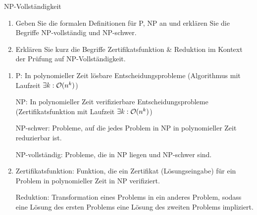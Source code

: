 \documentclass{article}
\begin{document}
\begin{exercise}{NP-Vollständigkeit}
  \begin{enumerate}
    \item Geben Sie die formalen Definitionen für P, NP an und erklären Sie die Begriffe NP-vollständig und NP-schwer.
    \item Erklären Sie kurz die Begriffe Zertifikatsfunktion \& Reduktion im Kontext der Prüfung auf NP-Vollständigkeit.
  \end{enumerate}

  \begin{solution}
    \begin{enumerate}
      \item P: In polynomieller Zeit lösbare Entscheidungsprobleme (Algorithmus mit Laufzeit $\exists k: \mathcal{O}(n^k)$)\par
            NP: In polynomieller Zeit verifizierbare Entscheidungsprobleme (Zertifikatsfunktion mit Laufzeit $\exists k: \mathcal{O}(n^k)$)\par
            NP-schwer: Probleme, auf die jedes Problem in NP in polynomieller Zeit reduzierbar ist.\par
            NP-vollständig: Probleme, die in NP liegen und NP-schwer sind.
      \item Zertifikatsfunktion: Funktion, die ein Zertifikat (Lösungseingabe) für ein Problem in polynomieller Zeit in NP verifiziert.\par
            Reduktion: Transformation eines Problems in ein anderes Problem, sodass eine Lösung des ersten Problems eine Lösung des zweiten Problems impliziert.
    \end{enumerate}
  \end{solution}
\end{exercise}
\end{document}
